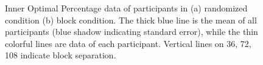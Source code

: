 \begin{figure}[ht]
\centering
{}
\decoRule
\caption[Inner Optimal Percentage data of participants]{Inner Optimal Percentage data of participants in (a) randomized condition (b) block condition. The thick blue line is the mean of all participants (blue shadow indicating standard error), while the thin colorful lines are data of each participant. Vertical lines on 36, 72, 108 indicate block separation. }
\label{fig:Inner Optimal Percentage Participants}
\end{figure}

